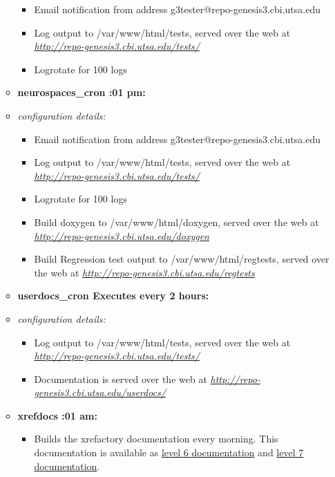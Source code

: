 \documentclass[12pt]{article}
\begin{document}
\begin{itemize}
\begin{itemize}
\begin{itemize}
	\item Email notification from address g3tester@repo-genesis3.cbi.utsa.edu
	\item Log output to /var/www/html/tests, served over the web at \href{http://repo-genesis3.cbi.utsa.edu/tests/}{\it http://repo-genesis3.cbi.utsa.edu/tests/}
	\item Logrotate for 100 logs
\end{itemize}

\item[] {\bf neurospaces\_cron :01 pm:}
	\item {\it configuration details:} 
\begin{itemize}

	\item Email notification from address g3tester@repo-genesis3.cbi.utsa.edu
	\item Log output to /var/www/html/tests, served over the web at \href{http://repo-genesis3.cbi.utsa.edu/tests/}{\it http://repo-genesis3.cbi.utsa.edu/tests/}
	\item Logrotate for 100 logs
	\item Build doxygen to /var/www/html/doxygen, served over the web at \href{http://repo-genesis3.cbi.utsa.edu/doxygen}{\it http://repo-genesis3.cbi.utsa.edu/doxygen}
	\item Build Regression test output to /var/www/html/regtests, served over the web at \href{http://repo-genesis3.cbi.utsa.edu/regtests}{\it http://repo-genesis3.cbi.utsa.edu/regtests}
\end{itemize}

\item[] {\bf userdocs\_cron \- Executes every 2 hours:}
	\item {\it configuration details:} 
\begin{itemize}

	\item Log output to /var/www/html/tests, served over the web at \href{http://repo-genesis3.cbi.utsa.edu/tests/}{\it http://repo-genesis3.cbi.utsa.edu/tests/}
	\item Documentation is served over the web at \href{http://repo-genesis3.cbi.utsa.edu/userdocs/}{\it http://repo-genesis3.cbi.utsa.edu/userdocs/}
\end{itemize}

\item[] {\bf xrefdocs :01 am:}
\begin{itemize}
	\item Builds the xrefactory documentation every morning.  This documentation is available as \href{http://www.neurospaces.org/doxygen-menu.html}{level 6 documentation} and \href{http://www.neurospaces.org/cxref-menu.html}{level 7 documentation}.
\end{itemize}
\end{itemize}

\end{itemize}
\end{document}
